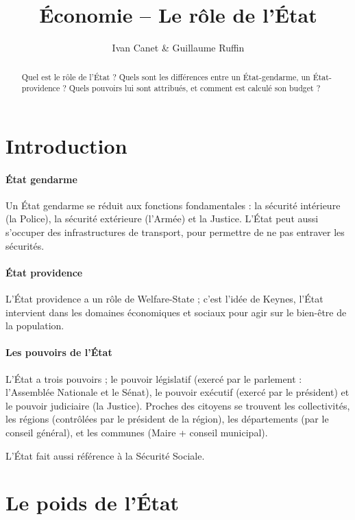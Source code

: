\documentclass[10pt,a4paper,french]{article}
\begin{document}
\title{Économie -- Le rôle de l'État}
\author{Ivan Canet \& Guillaume Ruffin}
\maketitle

\begin{abstract} %
Quel est le rôle de l'État ? Quels sont les différences entre un État-gendarme, un État-providence ? Quels pouvoirs lui sont attribués, et comment est calculé son budget ?
\end{abstract}

\tableofcontents

\section{Introduction}

\paragraph{État gendarme}
Un État gendarme se réduit aux fonctions fondamentales : la sécurité intérieure (la Police), la sécurité extérieure (l’Armée) et la Justice. L’État peut aussi s’occuper des infrastructures de transport, pour permettre de ne pas entraver les sécurités.

\paragraph{État providence}
L’État providence a un rôle de Welfare-State ; c’est l’idée de Keynes, l’État intervient dans les domaines économiques et sociaux pour agir sur le bien-être de la population.

\paragraph{Les pouvoirs de l'État}
L’État a trois pouvoirs ; le pouvoir législatif (exercé par le parlement : l’Assemblée Nationale et le Sénat), le pouvoir exécutif (exercé par le président) et le pouvoir judiciaire (la Justice).
Proches des citoyens se trouvent les collectivités, les régions (contrôlées par le président de la région), les départements (par le conseil général), et les communes (Maire + conseil municipal).

L’État fait aussi référence à la Sécurité Sociale.

\section{Le poids de l'État}
\end{document}
